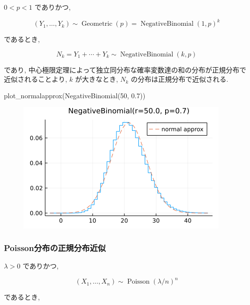 \documentclass[
  letterpaper,
  DIV=11,
  numbers=noendperiod]{scrartcl}
\newenvironment{Shaded}{\begin{snugshade}}{\end{snugshade}}
\newcommand{\FloatTok}[1]{\textcolor[rgb]{0.68,0.00,0.00}{#1}}
\newcommand{\FunctionTok}[1]{\textcolor[rgb]{0.28,0.35,0.67}{#1}}
\newcommand{\NormalTok}[1]{\textcolor[rgb]{0.00,0.23,0.31}{#1}}
\begin{document}
\(0 < p < 1\) でありかつ,

\[
(Y_1,\ldots,Y_k)\sim \operatorname{Geometric}(p) = \operatorname{NegativeBinomial}(1, p)^k
\]

であるとき,

\[
N_k = Y_1 + \cdots + Y_k \sim \operatorname{NegativeBinomial}(k, p)
\]

であり,
中心極限定理によって独立同分布な確率変数達の和の分布が正規分布で近似されることより,
\(k\) が大きなとき, \(N_k\) の分布は正規分布で近似される.

\begin{Shaded}
\begin{Highlighting}[]
\FunctionTok{plot\_normalapprox}\NormalTok{(}\FunctionTok{NegativeBinomial}\NormalTok{(}\FloatTok{50}\NormalTok{, }\FloatTok{0.7}\NormalTok{))}
\end{Highlighting}
\end{Shaded}

\begin{figure}[H]

{\centering \includegraphics{05 Central limit theorem_files/figure-pdf/cell-120-output-1.png}

}

\end{figure}

\hypertarget{poissonux5206ux5e03ux306eux6b63ux898fux5206ux5e03ux8fd1ux4f3c}{%
\subsubsection{Poisson分布の正規分布近似}\label{poissonux5206ux5e03ux306eux6b63ux898fux5206ux5e03ux8fd1ux4f3c}}

\(\lambda > 0\) でありかつ,

\[
(X_1, \ldots, X_n) \sim \operatorname{Poisson}(\lambda/n)^n
\]

であるとき,
\end{document}
